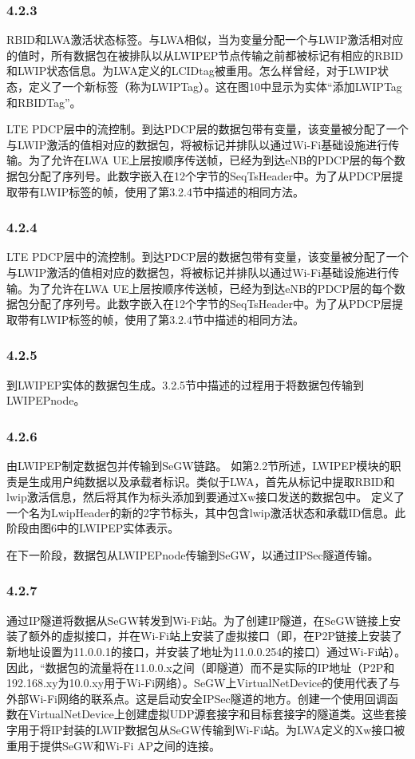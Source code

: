\subsubsection*{4.2.3}
RBID和LWA激活状态标签。与LWA相似，当为变量分配一个与LWIP激活相对应的值时，所有数据包在被排队以从LWIPEP节点传输之前都被标记有相应的RBID和LWIP状态信息。为LWA定义的LCIDtag被重用。怎么样曾经，对于LWIP状态，定义了一个新标签（称为LWIPTag）。这在图10中显示为实体“添加LWIPTag和RBIDTag”。

LTE PDCP层中的流控制。到达PDCP层的数据包带有变量，该变量被分配了一个与LWIP激活的值相对应的数据包，将被标记并排队以通过Wi-Fi基础设施进行传输。为了允许在LWA UE上层按顺序传送帧，已经为到达eNB的PDCP层的每个数据包分配了序列号。此数字嵌入在12个字节的SeqTsHeader中。为了从PDCP层提取带有LWIP标签的帧，使用了第3.2.4节中描述的相同方法。

\subsubsection*{4.2.4}
LTE 
PDCP层中的流控制。到达PDCP层的数据包带有变量，该变量被分配了一个与LWIP激活的值相对应的数据包，将被标记并排队以通过Wi-Fi基础设施进行传输。为了允许在LWA UE上层按顺序传送帧，已经为到达eNB的PDCP层的每个数据包分配了序列号。此数字嵌入在12个字节的SeqTsHeader中。为了从PDCP层提取带有LWIP标签的帧，使用了第3.2.4节中描述的相同方法。

\subsubsection*{4.2.5}
到LWIPEP实体的数据包生成。3.2.5节中描述的过程用于将数据包传输到LWIPEPnode。

\subsubsection*{4.2.6}
由LWIPEP制定数据包并传输到SeGW链路。
如第2.2节所述，LWIPEP模块的职责是生成用户纯数据以及承载者标识。类似于LWA，首先从标记中提取RBID和lwip激活信息，然后将其作为标头添加到要通过Xw接口发送的数据包中。
定义了一个名为LwipHeader的新的2字节标头，其中包含lwip激活状态和承载ID信息。此阶段由图6中的LWIPEP实体表示。

在下一阶段，数据包从LWIPEPnode传输到SeGW，以通过IPSec隧道传输。

\subsubsection*{4.2.7}
通过IP隧道将数据从SeGW转发到Wi-Fi站。为了创建IP隧道，在SeGW链接上安装了额外的虚拟接口，并在Wi-Fi站上安装了虚拟接口（即，在P2P链接上安装了新地址设置为11.0.0.1的接口，并安装了地址为11.0.0.254的接口）通过Wi-Fi站）。因此，“数据包的流量将在11.0.0.x之间（即隧道）而不是实际的IP地址（P2P和192.168.xy为10.0.xy用于Wi-Fi网络）。SeGW上VirtualNetDevice的使用代表了与外部Wi-Fi网络的联系点。这是启动安全IPSec隧道的地方。创建一个使用回调函数在VirtualNetDevice上创建虚拟UDP源套接字和目标套接字的隧道类。这些套接字用于将IP封装的LWIP数据包从SeGW传输到Wi-Fi站。为LWA定义的Xw接口被重用于提供SeGW和Wi-Fi AP之间的连接。


